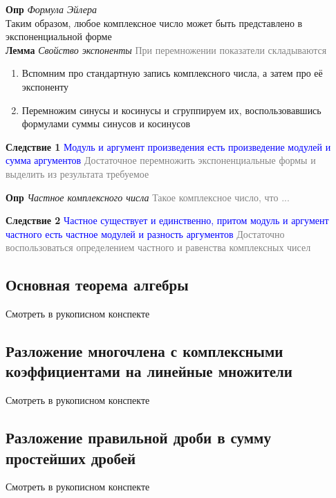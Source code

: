 \documentclass[a4paper, 14pt]{article}
\begin{document}
    \textbf{Опр} \textit{Формула Эйлера} \\

    Таким образом, любое комплексное число может быть представлено в экспоненциальной форме \\

    \textbf{Лемма} \textit{Свойство экспоненты} \textcolor{gray}{При перемножении показатели складываются}

    \begin{enumerate}
        \item Вспомним про стандартную запись комплексного числа, а затем про её экспоненту
        \item Перемножим синусы и косинусы и сгруппируем их, воспользовавшись формулами суммы синусов и косинусов
    \end{enumerate}

    \textbf{Следствие 1}
    \textcolor{blue}{Модуль и аргумент произведения есть произведение модулей и сумма аргументов}
    \textcolor{gray}{Достаточное перемножить экспоненциальные формы и выделить из результата требуемое}

    \textbf{Опр} \textit{Частное комплексного числа} \textcolor{gray}{Такое комплексное число, что ...}

    \textbf{Следствие 2}
    \textcolor{blue}{Частное существует и единственно, притом модуль и аргумент частного есть частное модулей и
    разность аргументов}
    \textcolor{gray}{Достаточно воспользоваться определением частного и равенства комплексных чисел}

    \subsection{Основная теорема алгебры}

    Смотреть в рукописном конспекте

    \subsection{Разложение многочлена с комплексными коэффициентами на линейные множители}

    Смотреть в рукописном конспекте

    \subsection{Разложение правильной дроби в сумму простейших дробей}

    Смотреть в рукописном конспекте
\end{document}
